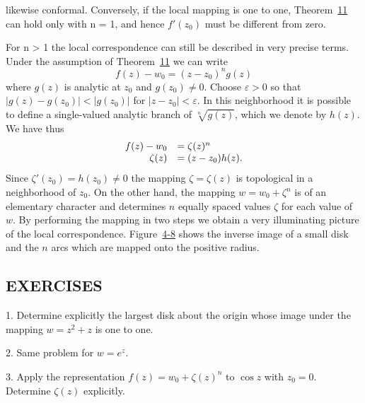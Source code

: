 
likewise conformal. Conversely, if the local mapping is one to one, Theorem~\hyperref[thm:4.11]{11} can hold only with n = 1, and hence $f'(z_0)$ must be different from zero.

For n > 1 the local correspondence can still be described in very precise terms. Under the assumption of Theorem~\hyperref[thm:4.11]{11} we can write
\begin{equation*}
f (z) - w _ {0} = (z - z _ {0}) ^ {n} g (z)
\end{equation*}
where $g(z)$ is analytic at $z_0$ and $g(z_0) \neq 0$. Choose $\varepsilon > 0$ so that $|g(z) - g(z_0)| < |g(z_0)|$ for $|z - z_0| < \varepsilon$. In this neighborhood it is possible to define a single-valued analytic branch of $\sqrt[n]{g(z)}$, which we denote by $h(z)$. We have thus
\begin{equation*}
\begin{array}{r l} f (z) - w _ {0} & = \zeta (z) ^ {n} \\ \zeta (z) & = (z - z _ {0}) h (z). \end{array}
\end{equation*}
Since $\zeta'(z_0) = h(z_0) \neq 0$ the mapping $\zeta = \zeta(z)$ is topological in a neighborhood of $z_0$. On the other hand, the mapping $w = w_0 + \zeta^n$ is of an elementary character and determines $n$ equally spaced values $\zeta$ for each value of $w$. By performing the mapping in two steps we obtain a very illuminating picture of the local correspondence. Figure~\hyperref[fig:4-8]{4-8} shows the inverse image of a small disk and the $n$ arcs which are mapped onto the positive radius.

\subsection*{EXERCISES}
1. Determine explicitly the largest disk about the origin whose image under the mapping $w = z^{2} + z$ is one to one.

2. Same problem for $w = e^{z}$.

3. Apply the representation $f(z) = w_0 + \zeta(z)^n$ to $\cos z$ with $z_0 = 0$. Determine $\zeta(z)$ explicitly.

